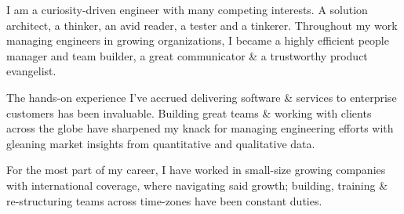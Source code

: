 I am a curiosity-driven engineer with many competing interests. A solution architect, a thinker, an avid reader, a tester and a tinkerer. Throughout my work managing engineers in growing organizations, I became a highly efficient people manager and team builder, a great communicator \& a trustworthy product evangelist.

The hands-on experience I've accrued delivering software \& services to enterprise customers has been invaluable. Building great teams \& working with clients across the globe have sharpened my knack for managing engineering efforts with gleaning market insights from quantitative and qualitative data.

For the most part of my career, I have worked in small-size growing companies with international coverage, where navigating said growth; building, training \& re-structuring teams across time-zones have been constant duties.